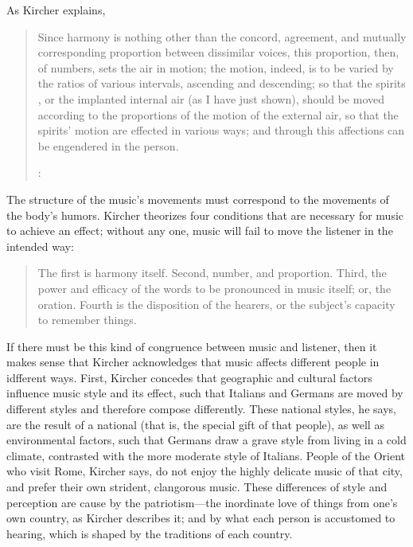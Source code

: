 As Kircher explains, 
\begin{quote}
    Since harmony is nothing other than the concord, agreement, and mutually corresponding proportion between dissimilar voices,
    this proportion, then, of numbers, sets the air in motion;
    the motion, indeed, is to be varied by the ratios of various intervals, ascending and descending;
    so that the spirits , or the implanted internal air (as I have just shown), should be moved according to the proportions of the motion of the external air, so that the spirits' motion are effected in various ways; and through this affections can be engendered in the person.%
    \begin{Footnote}
        \Autocite[552]{Kircher:Musurgia}: \XXX
    \end{Footnote}
\end{quote}

The structure of the music's movements must correspond to the movements of the body's humors.
Kircher theorizes four conditions that are necessary for music to achieve an effect; without any one, music will fail to move the listener in the intended way:
\begin{quote}
  The first is harmony itself.
  Second, number, and proportion.
  Third, the power and efficacy of the words to be pronounced in music itself; or, the oration.
  Fourth is the disposition of the hearers, or the subject's capacity to remember things. 
\end{quote}

If there must be this kind of congruence between music and listener, then it makes sense that Kircher acknowledges that music affects different people in idfferent ways.
First, Kircher concedes that geographic and cultural factors influence music style and its effect, such that Italians and Germans are moved by different styles and therefore compose differently.
These national styles, he says, are the result of a national  (that is, the special gift of that people), as well as environmental factors, such that Germans draw a grave style from living in a cold climate, contrasted with the more moderate style of Italians.
People of the Orient who visit Rome, Kircher says, do not enjoy the highly delicate music of that city, and prefer their own strident, clangorous music.
These differences of style and perception are cause by the patriotism---the inordinate love of things from one's own country, as Kircher describes it; and by what each person is accustomed to hearing, which is shaped by the traditions of each country.%
    \Autocite[543--544]{Kircher:Musurgia} %


